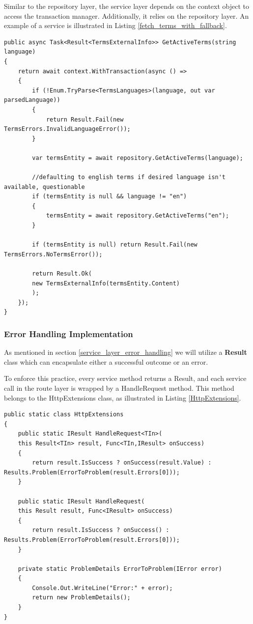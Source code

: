 Similar to the repository layer, the service layer depends on the context object to access the transaction manager. Additionally, it relies on the repository layer. An example of a service is illustrated in Listing \ref{fetch_terms_with_fallback}.

\begin{lstlisting}[style=sharpc, caption={Retrieving active terms with language fallback}, label={fetch_terms_with_fallback}] 
public async Task<Result<TermsExternalInfo>> GetActiveTerms(string language)
{
	return await context.WithTransaction(async () =>
	{
		if (!Enum.TryParse<TermsLanguages>(language, out var parsedLanguage))
		{
			return Result.Fail(new TermsErrors.InvalidLanguageError());
		}
		
		var termsEntity = await repository.GetActiveTerms(language);
		
		//defaulting to english terms if desired language isn't available, questionable
		if (termsEntity is null && language != "en")
		{
			termsEntity = await repository.GetActiveTerms("en");
		}
		
		if (termsEntity is null) return Result.Fail(new TermsErrors.NoTermsError());
		
		return Result.Ok(
		new TermsExternalInfo(termsEntity.Content)
		);
	});
}
\end{lstlisting}

\newpage

\subsubsection{Error Handling Implementation}
As mentioned in section \ref{service_layer_error_handling} we will utilize a \textbf{Result} class which can encapsulate either a successful outcome or an error.

To enforce this practice, every service method returns a Result, and each service call in the route layer is wrapped by a HandleRequest method. This method belongs to the HttpExtensions class, as illustrated in Listing \ref{HttpExtensions}.

\begin{lstlisting}[style=sharpc, caption={Custom Extension Methods for Handling HTTP Requests in ASP.NET Core: Simplifying Success and Error Response Handling.}, label={HttpExtensions}]
public static class HttpExtensions
{
	public static IResult HandleRequest<TIn>(
	this Result<TIn> result, Func<TIn,IResult> onSuccess)
	{
		return result.IsSuccess ? onSuccess(result.Value) : Results.Problem(ErrorToProblem(result.Errors[0]));
	}
	
	public static IResult HandleRequest(
	this Result result, Func<IResult> onSuccess)
	{
		return result.IsSuccess ? onSuccess() : Results.Problem(ErrorToProblem(result.Errors[0]));
	}
	
	private static ProblemDetails ErrorToProblem(IError error)
	{
		Console.Out.WriteLine("Error:" + error);
		return new ProblemDetails();
	}
}
\end{lstlisting}



